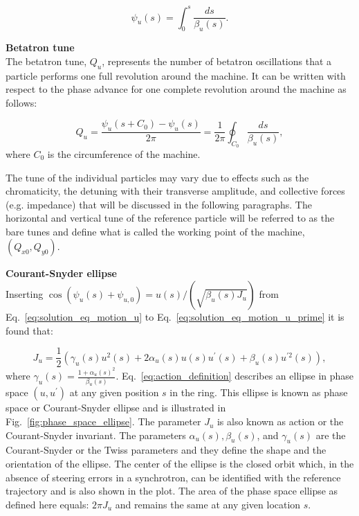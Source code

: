 \begin{equation}\label{eq:phase_advance_definition_with_twiss}
    \psi_u(s)= \int_{0}^{s} \frac{ds}{\beta_u(s)}.
\end{equation}

\textbf{Betatron tune}\\
The betatron tune, $Q_u$, represents the number of betatron oscillations that a particle performs one full revolution around the machine. It can be written with respect to the phase advance for one complete revolution around the machine as follows:

\begin{equation}\label{eq:betatron_tune}
    Q_u = \frac{\psi_u(s+C_0)-\psi_u(s)}{2\pi} = \frac{1}{2\pi} \oint_{C_0} \frac{ds}{\beta_u(s)},
\end{equation}
where $C_0$ is the circumference of the machine. 

The tune of the individual particles may vary due to effects such as the chromaticity, the detuning with their transverse amplitude, and collective forces (e.g. impedance) that will be discussed in the following paragraphs. The horizontal and vertical tune of the reference particle will be referred to as the bare tunes and define what is called the working point of the machine, $(Q_{x0}, Q_{y0})$. 

\textbf{Courant-Snyder ellipse}\\
Inserting $\cos{(\psi_u(s)+ \psi_{u,0})} = u(s)/(\sqrt{\beta_u(s) J_u})$ from Eq.~\eqref{eq:solution_eq_motion_u} to Eq.~\eqref{eq:solution_eq_motion_u_prime} it is found that:

\begin{equation}\label{eq:action_definition}
    J_u = \frac{1}{2} (\gamma_u(s) u^2(s) + 2 \alpha_u(s) u(s) u^\prime(s) + \beta_u(s) u^{\prime 2}(s)),
\end{equation}
where $\gamma_u(s)=\frac{1+\alpha_u(s)^2}{\beta_u(s)}$. Eq.~\eqref{eq:action_definition} describes an ellipse in phase space $(u, u^\prime)$ at any given position $s$ in the ring. This ellipse is known as phase space or Courant-Snyder ellipse and is illustrated in Fig.~\ref{fig:phase_space_ellipse}. The parameter $J_u$ is also known as action or the Courant-Snyder invariant. The parameters $\alpha_u(s), \beta_u(s)$, and $\gamma_u(s)$ are the Courant-Snyder or the Twiss parameters and they define the shape and the orientation of the ellipse. The center of the ellipse is the closed orbit which, in the absence of steering errors in a synchrotron, can be identified with the reference trajectory and is also shown in the plot. The area of the phase space ellipse as defined here equals: $2\pi J_u$ and remains the same at any given location $s$.

